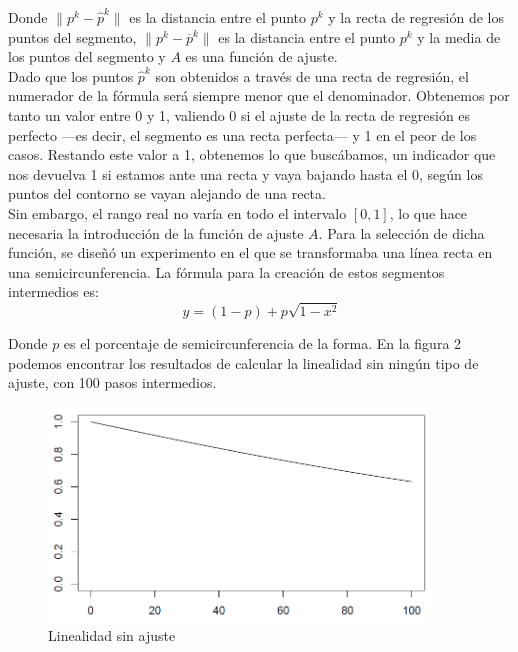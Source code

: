 Donde $\parallel p^k - \widehat{p}^k \parallel$ es la distancia entre el punto $p^k$ y la recta de regresión de los puntos del segmento, $\parallel p^k - \overline{p}^k \parallel$ es la distancia entre el punto $p^k$ y la media de los puntos del segmento y $A$ es una función de ajuste.\\

Dado que los puntos $\widehat{p}^k$ son obtenidos a través de una recta de regresión, el numerador de la fórmula será siempre menor que el denominador. Obtenemos por tanto un valor entre 0 y 1, valiendo 0 si el ajuste de la recta de regresión es perfecto ---es decir, el segmento es una recta perfecta--- y 1 en el peor de los casos. Restando este valor a 1, obtenemos lo que buscábamos, un indicador que nos devuelva 1 si estamos ante una recta y vaya bajando hasta el 0, según los puntos del contorno se vayan alejando de una recta.\\

Sin embargo, el rango real no varía en todo el intervalo $\left[ 0,1 \right]$, lo que hace necesaria la introducción de la función de ajuste $A$. Para la selección de dicha función, se diseñó un experimento en el que se transformaba una línea recta en una semicircunferencia. La fórmula para la creación de estos segmentos intermedios es:\\

\[
\ y = (1-p)+ p \sqrt{1-x^2}
\]

Donde $p$ es el porcentaje de semicircunferencia de la forma. En la figura 2 podemos encontrar los resultados de calcular la linealidad sin ningún tipo de ajuste, con 100 pasos intermedios.\\

\begin{figure}[H]
\begin{center}

\includegraphics[width=0.9\textwidth]{img/linea-curva.png}
\end{center}

\caption{Linealidad sin ajuste}
\end{figure}

